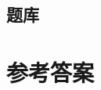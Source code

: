 \documentclass[UTF8]{ctexart}
\begin{document}
\begin{center}
\section*{题库}
\end{center}

\begin{enumerate}
\foreachproblem{\item\label{prob:\thisproblemlabel}\thisproblem}
\end{enumerate}





\newpage
\showanswers
\section*{参考答案}
\begin{itemize}
\end{itemize}
\end{document}
